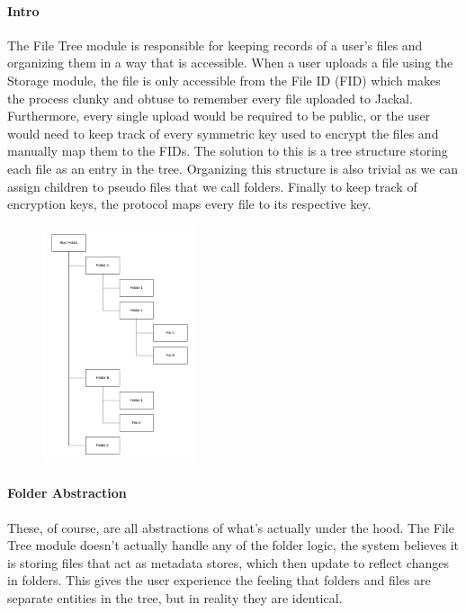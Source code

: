 \documentclass[a4paper]{article}
\begin{document}
\paragraph{Intro}
The File Tree module is responsible for keeping records of a user's files and organizing them in a way that is accessible. When a user uploads a file using the Storage module, the file is only accessible from the File ID (FID) which makes the process clunky and obtuse to remember every file uploaded to Jackal. Furthermore, every single upload would be required to be public, or the user would need to keep track of every symmetric key used to encrypt the files and manually map them to the FIDs. The solution to this is a tree structure storing each file as an entry in the tree. Organizing this structure is also trivial as we can assign children to pseudo files that we call folders. Finally to keep track of encryption keys, the protocol maps every file to its respective key.

\begin{figure}[!htbp]
\centering
\includegraphics[width=0.4\textwidth]{assets/filetree1.png}
\caption{}
\end{figure}

\paragraph{Folder Abstraction}
These, of course, are all abstractions of what's actually under the hood. The File Tree module doesn't actually handle any of the folder logic, the system believes it is storing files that act as metadata stores, which then update to reflect changes in folders. This gives the user experience the feeling that folders and files are separate entities in the tree, but in reality they are identical.
\end{document}
